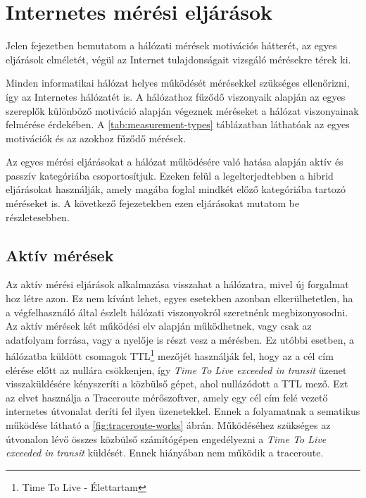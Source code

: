 
\section{Internetes mérési eljárások}
 
 

Jelen fejezetben bemutatom a hálózati mérések motivációs hátterét, az egyes eljárások elméletét, végül az Internet tulajdonságait vizsgáló mérésekre térek ki.

Minden informatikai hálózat helyes működését mérésekkel szükséges ellenőrizni, így az Internetes hálózatét is. A hálózathoz fűződő viszonyaik alapján az egyes szereplők különböző motiváció alapján végeznek méréseket a hálózat viszonyainak felmérése érdekében. A \ref{tab:measurement-types} táblázatban\cite{networkMeasure} láthatóak az egyes motivációk és az azokhoz fűződő mérések. 



Az egyes mérési eljárásokat a hálózat működésére való hatása alapján aktív és passzív kategóriába csoportosítjuk. Ezeken felül a legelterjedtebben a hibrid eljárásokat használják, amely magába foglal mindkét előző kategóriába tartozó méréseket is. A következő fejezetekben ezen eljárásokat mutatom be részletesebben.

\subsection{Aktív mérések}

Az aktív mérési eljárások alkalmazása visszahat a hálózatra, mivel új forgalmat hoz létre azon. Ez nem kívánt lehet, egyes esetekben azonban elkerülhetetlen, ha a végfelhasználó által észlelt hálózati viszonyokról szeretnénk megbizonyosodni.
Az aktív mérések két működési elv alapján működhetnek, vagy csak az adatfolyam forrása, vagy a nyelője is részt vesz a mérésben. Ez utóbbi esetben, a hálózatba küldött csomagok TTL\footnote{Time To Live - Élettartam} mezőjét használják fel, hogy az a cél cím elérése előtt az nullára csökkenjen, így \textit{Time To Live exceeded in transit} üzenet visszaküldésére kényszeríti a közbülső gépet, ahol nullázódott a TTL mező. Ezt az elvet használja a Traceroute mérőszoftver, amely egy cél cím felé vezető internetes útvonalat deríti fel ilyen üzenetekkel. Ennek a folyamatnak a sematikus működése látható a \ref{fig:traceroute-works} ábrán. Működéséhez szükséges az útvonalon lévő összes közbülső számítógépen engedélyezni a \textit{Time To Live exceeded in transit} küldését. Ennek hiányában nem működik a traceroute.

